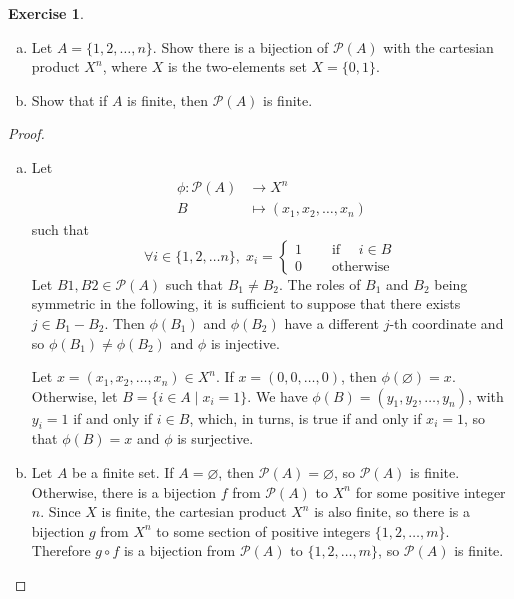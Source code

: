 \documentclass[11pt,a4paper,twoside]{article}
\theoremstyle{definition}
\newcounter{excounter}
\newtheorem{exercise}[excounter]{Exercise}
\begin{document}
\begin{exercise}

  \begin{enumerate}[(a)]
  \item Let $A = \{ 1, 2, \dotsc, n \}$. Show there is a bijection of $\mathscr{P} (A)$
    with the cartesian product $X^n$, where $X$ is the two-elements set $X = \{ 0, 1 \}$.
  \item Show that if $A$ is finite, then $\mathscr{P} (A)$ is finite.
  \end{enumerate}

\end{exercise}

\begin{proof}\hfill

  \begin{enumerate}[(a)]

  \item Let
    \begin{align*}
      \phi : \mathscr{P} (A) &\to X^n \\
      B &\mapsto (x_1, x_2, \dotsc, x_n)
    \end{align*}
    such that
    \begin{equation*}
      \forall i \in \{ 1, 2, \dotsc n \}, \; x_i = \begin{cases}
        1 &\quad\text{ if }\quad i \in B \\
        0 &\quad\text{ otherwise }
      \end{cases}
    \end{equation*}
    Let $B1, B2 \in \mathscr{P} (A)$ such that $B_1 \neq B_2$. The roles of $B_1$ and $B_2$ being symmetric in the following,
    it is sufficient to suppose that there exists $j \in B_1 - B_2$. Then $\phi (B_1)$ and $\phi (B_2)$ have a different $j$-th
    coordinate and so $\phi (B_1) \neq \phi (B_2)$ and $\phi$ is injective.

    Let $x = (x_1, x_2, \dotsc, x_n) \in X^n$. If $x = (0, 0, \dotsc, 0)$, then $\phi (\varnothing) = x$.
    Otherwise, let $B = \{ i \in A \mid x_i = 1 \}$. We have $\phi (B) = (y_1, y_2, \dotsc, y_n)$, with
    $y_i = 1$ if and only if $i \in B$, which, in turns, is true if and only if $x_i = 1$, so that $\phi (B) = x$
    and $\phi$ is surjective.

  \item Let $A$ be a finite set. If $A = \varnothing$, then $\mathscr{P} (A) = \varnothing$, so $\mathscr{P} (A)$ is finite.
    Otherwise, there is a bijection $f$ from $\mathscr{P} (A)$ to $X^n$ for some positive integer $n$.
    Since $X$ is finite, the cartesian product $X^n$ is also finite, so there is a bijection $g$ from $X^n$ to some section
    of positive integers $\{ 1, 2, \dotsc, m \}$. Therefore $g \circ f$ is a bijection from $\mathscr{P} (A)$ to $\{ 1, 2, \dotsc, m \}$,
    so $\mathscr{P} (A)$ is finite.

  \end{enumerate}

\end{proof}
\end{document}
